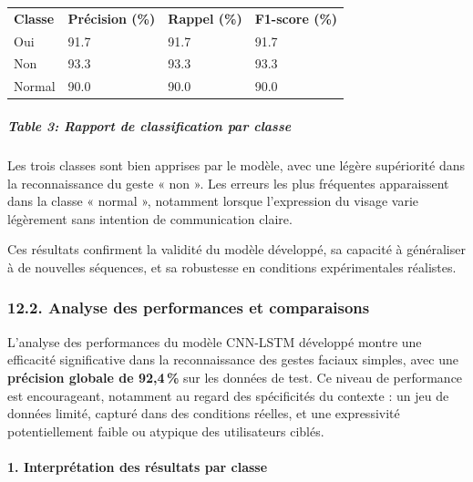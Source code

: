 \documentclass[
]{article}
\begin{document}
\begin{longtable}[]{@{}llll@{}}
\toprule
\endhead
\textbf{Classe} & \textbf{Précision (\%)} & \textbf{Rappel (\%)} & \textbf{F1-score (\%)} \\
Oui & 91.7 & 91.7 & 91.7 \\
Non & 93.3 & 93.3 & 93.3 \\
Normal & 90.0 & 90.0 & 90.0 \\
\bottomrule
\end{longtable}

\hypertarget{table-3-rapport-de-classification-par-classe}{%
\subparagraph{Table 3: Rapport de classification par classe}\label{table-3-rapport-de-classification-par-classe}}

Les trois classes sont bien apprises par le modèle, avec une légère supériorité dans la reconnaissance du geste « non ». Les erreurs les plus fréquentes apparaissent dans la classe « normal », notamment lorsque l'expression du visage varie légèrement sans intention de communication claire.

Ces résultats confirment la validité du modèle développé, sa capacité à généraliser à de nouvelles séquences, et sa robustesse en conditions expérimentales réalistes.

\hypertarget{analyse-des-performances-et-comparaisons}{%
\subsubsection{12.2. Analyse des performances et comparaisons}\label{analyse-des-performances-et-comparaisons}}

L'analyse des performances du modèle CNN-LSTM développé montre une efficacité significative dans la reconnaissance des gestes faciaux simples, avec une \textbf{précision globale de 92,4\,\%} sur les données de test. Ce niveau de performance est encourageant, notamment au regard des spécificités du contexte : un jeu de données limité, capturé dans des conditions réelles, et une expressivité potentiellement faible ou atypique des utilisateurs ciblés.

\hypertarget{interpruxe9tation-des-ruxe9sultats-par-classe}{%
\paragraph{\texorpdfstring{\textbf{1. Interprétation des résultats par classe}}{1. Interprétation des résultats par classe}}\label{interpruxe9tation-des-ruxe9sultats-par-classe}}
\end{document}
